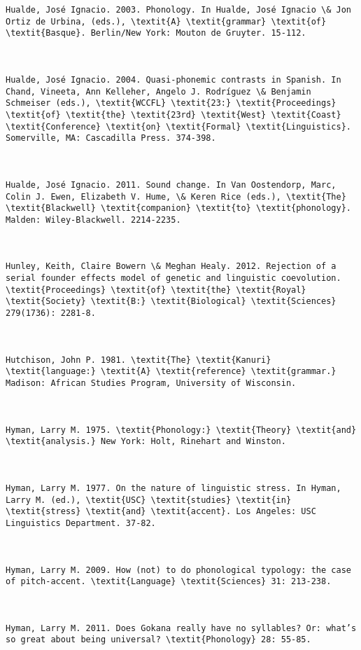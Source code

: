 \begin{verbatim}
Hualde, José Ignacio. 2003. Phonology. In Hualde, José Ignacio \& Jon Ortiz de Urbina, (eds.), \textit{A} \textit{grammar} \textit{of} \textit{Basque}. Berlin/New York: Mouton de Gruyter. 15-112.



Hualde, José Ignacio. 2004. Quasi-phonemic contrasts in Spanish. In Chand, Vineeta, Ann Kelleher, Angelo J. Rodríguez \& Benjamin Schmeiser (eds.), \textit{WCCFL} \textit{23:} \textit{Proceedings} \textit{of} \textit{the} \textit{23rd} \textit{West} \textit{Coast} \textit{Conference} \textit{on} \textit{Formal} \textit{Linguistics}. Somerville, MA: Cascadilla Press. 374-398.



Hualde, José Ignacio. 2011. Sound change. In Van Oostendorp, Marc, Colin J. Ewen, Elizabeth V. Hume, \& Keren Rice (eds.), \textit{The} \textit{Blackwell} \textit{companion} \textit{to} \textit{phonology}. Malden: Wiley-Blackwell. 2214-2235.



Hunley, Keith, Claire Bowern \& Meghan Healy. 2012. Rejection of a serial founder effects model of genetic and linguistic coevolution. \textit{Proceedings} \textit{of} \textit{the} \textit{Royal} \textit{Society} \textit{B:} \textit{Biological} \textit{Sciences} 279(1736): 2281-8.



Hutchison, John P. 1981. \textit{The} \textit{Kanuri} \textit{language:} \textit{A} \textit{reference} \textit{grammar.} Madison: African Studies Program, University of Wisconsin.



Hyman, Larry M. 1975. \textit{Phonology:} \textit{Theory} \textit{and} \textit{analysis.} New York: Holt, Rinehart and Winston.



Hyman, Larry M. 1977. On the nature of linguistic stress. In Hyman, Larry M. (ed.), \textit{USC} \textit{studies} \textit{in} \textit{stress} \textit{and} \textit{accent}. Los Angeles: USC Linguistics Department. 37-82. 



Hyman, Larry M. 2009. How (not) to do phonological typology: the case of pitch-accent. \textit{Language} \textit{Sciences} 31: 213-238.



Hyman, Larry M. 2011. Does Gokana really have no syllables? Or: what’s so great about being universal? \textit{Phonology} 28: 55-85.




\end{verbatim}
